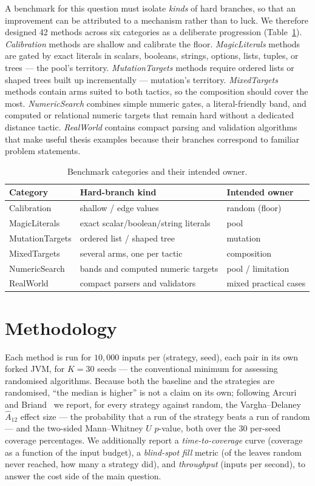 \documentclass[11pt,a4paper]{report}
\begin{document}
A benchmark for this question must isolate \emph{kinds} of hard branches, so that an improvement can be
attributed to a mechanism rather than to luck. We therefore designed 42 methods across six categories as a
deliberate progression (Table~\ref{tab:categories}). \emph{Calibration} methods are shallow and calibrate the
floor. \emph{MagicLiterals} methods are gated by exact literals in scalars, booleans, strings, options, lists, tuples,
or trees — the pool's territory. \emph{MutationTargets} methods require ordered lists or shaped trees built up
incrementally — mutation's territory. \emph{MixedTargets} methods contain arms suited to both tactics, so the
composition should cover the most. \emph{NumericSearch} combines simple numeric gates, a literal-friendly
band, and computed or relational numeric targets that remain hard without a dedicated distance tactic.
\emph{RealWorld} contains compact parsing and validation algorithms that make useful thesis examples because
their branches correspond to familiar problem statements.

\begin{table}[t]
\centering\small
\caption{Benchmark categories and their intended owner.}
\label{tab:categories}
\begin{tabular}{lll}
\toprule
Category & Hard-branch kind & Intended owner \\
\midrule
Calibration     & shallow / edge values              & random (floor) \\
MagicLiterals   & exact scalar/boolean/string literals & pool \\
MutationTargets & ordered list / shaped tree         & mutation \\
MixedTargets    & several arms, one per tactic        & composition \\
NumericSearch   & bands and computed numeric targets & pool / limitation \\
RealWorld       & compact parsers and validators     & mixed practical cases \\
\bottomrule
\end{tabular}
\end{table}

\section{Methodology}
\label{sec:methodology}

Each method is run for $10{,}000$ inputs per (strategy, seed), each pair in its own forked JVM, for
$K{=}30$ seeds — the conventional minimum for assessing randomised algorithms. Because both the baseline and
the strategies are randomised, ``the median is higher'' is not a claim on its own; following Arcuri and
Briand~\cite{arcuri2014} we report, for every strategy against random, the Vargha--Delaney $\hat{A}_{12}$
effect size — the probability that a run of the strategy beats a run of random — and the two-sided
Mann--Whitney $U$ $p$-value, both over the $30$ per-seed coverage percentages. We additionally report a
\emph{time-to-coverage} curve (coverage as a function of the input budget), a \emph{blind-spot fill} metric
(of the leaves random never reached, how many a strategy did), and \emph{throughput} (inputs per second), to
answer the cost side of the main question.
\end{document}
